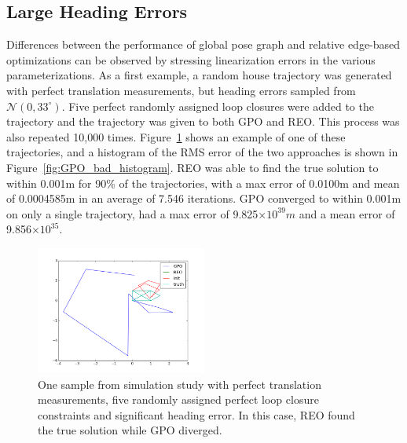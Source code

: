\subsection{Large Heading Errors}
Differences between the performance of global pose graph and relative edge-based optimizations can be observed by stressing linearization errors in the various parameterizations. As a first example, a random house trajectory was generated with perfect translation measurements, but heading errors sampled from $\mathcal{N}(0, 33^\circ)$. Five perfect randomly assigned loop closures were added to the trajectory and the trajectory was given to both GPO and REO.  This process was also repeated 10,000 times.  Figure~\ref{fig:GPO_heading_divergence} shows an example of one of these trajectories, and a histogram of the RMS error of the two approaches is shown in Figure~\ref{fig:GPO_bad_histogram}. REO was able to find the true solution to within 0.001m for 90\% of the trajectories, with a max error of 0.0100m and mean of 0.0004585m in an average of 7.546 iterations.  GPO converged to within 0.001m on only a single trajectory, had a max error of 9.825$\times 10 ^{39}m$ and a mean error of 9.856$\times 10 ^{35}$.

\begin{figure}[H]
  \includegraphics[width=0.5\textwidth]{figures/GPO_diverged.png}
  \caption{One sample from simulation study with perfect translation measurements, five randomly assigned perfect loop closure constraints and significant heading error.  In this case, REO found the true solution while GPO diverged.}
  \label{fig:GPO_heading_divergence}
\end{figure}

